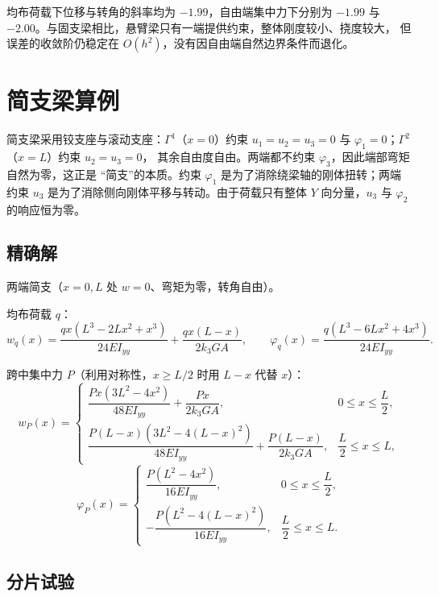 \documentclass[UTF8,a4paper,11pt]{ctexart}
\begin{document}
均布荷载下位移与转角的斜率均为 $-1.99$，自由端集中力下分别为 $-1.99$ 与
$-2.00$。与固支梁相比，悬臂梁只有一端提供约束，整体刚度较小、挠度较大，
但误差的收敛阶仍稳定在 $O(h^2)$，没有因自由端自然边界条件而退化。

\section{简支梁算例}

简支梁采用铰支座与滚动支座：$\Gamma^1$（$x=0$）约束
$u_1=u_2=u_3=0$ 与 $\varphi_1=0$；$\Gamma^2$（$x=L$）约束 $u_2=u_3=0$，
其余自由度自由。两端都不约束 $\varphi_3$，因此端部弯矩自然为零，这正是
“简支”的本质。约束 $\varphi_1$ 是为了消除绕梁轴的刚体扭转；两端约束 $u_3$
是为了消除侧向刚体平移与转动。由于荷载只有整体 $Y$ 向分量，$u_3$ 与
$\varphi_2$ 的响应恒为零。

\subsection{精确解}

两端简支（$x=0,L$ 处 $w=0$、弯矩为零，转角自由）。

均布荷载 $q$：
\begin{equation}\label{eq:simple-q}
w_q(x)=\frac{qx\left(L^3-2Lx^2+x^3\right)}{24EI_{yy}}+\frac{qx(L-x)}{2k_3GA},
\qquad
\varphi_q(x)=\frac{q\left(L^3-6Lx^2+4x^3\right)}{24EI_{yy}}.
\end{equation}

跨中集中力 $P$（利用对称性，$x\ge L/2$ 时用 $L-x$ 代替 $x$）：
\begin{equation}\label{eq:simple-P}
w_P(x)=
\begin{cases}
\dfrac{Px\left(3L^2-4x^2\right)}{48EI_{yy}}+\dfrac{Px}{2k_3GA}, & 0\le x\le \dfrac{L}{2},\\[8pt]
\dfrac{P(L-x)\left(3L^2-4(L-x)^2\right)}{48EI_{yy}}+\dfrac{P(L-x)}{2k_3GA}, & \dfrac{L}{2}\le x\le L,
\end{cases}
\end{equation}
\begin{equation}\label{eq:simple-P-phi}
\varphi_P(x)=
\begin{cases}
\dfrac{P\left(L^2-4x^2\right)}{16EI_{yy}}, & 0\le x\le \dfrac{L}{2},\\[8pt]
-\dfrac{P\left(L^2-4(L-x)^2\right)}{16EI_{yy}}, & \dfrac{L}{2}\le x\le L.
\end{cases}
\end{equation}

\subsection{分片试验}
\end{document}
